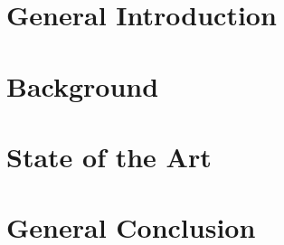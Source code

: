 \documentclass[12pt,a4paper,oneside]{report}
\title{\ThesisTitle}
\author{\StudentName}
\begin{document}







\tableofcontents
\listoffigures
\listoftables


\clearpage
{}

\part{General Introduction}


\part{Background}


\part{State of the Art}


\part{General Conclusion}


\printbibliography[heading=bibintoc]
\end{document}
